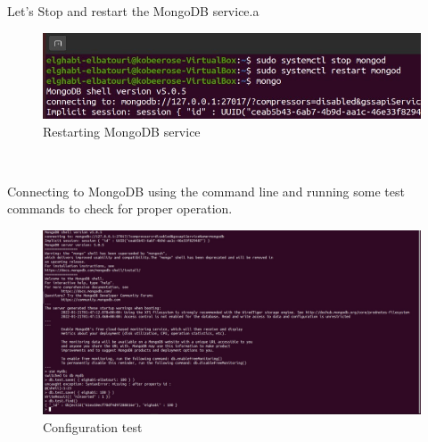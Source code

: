 \begin{spacing}{1.2}
\par Let's Stop and restart the MongoDB service.a
\\
\begin{figure}[!htb] 
\begin{center} 
\includegraphics[width=1\linewidth]{Pictures/MongoDB/Installation and manipulation of MongoDB/Mongodb service management/restarting MongoDB service} 
\end{center} 
\caption{Restarting MongoDB service} 
\end{figure}  \FloatBarrier
\\
\newpage
\par Connecting to MongoDB using the command line and running some test commands to
check for proper operation.
\\
\begin{figure}[!htb] 
\begin{center} 
\includegraphics[width=1\linewidth]{Pictures/MongoDB/Installation and manipulation of MongoDB/Mongodb service management/configuration test} 
\end{center} 
\caption{Configuration test} 
\end{figure}  \FloatBarrier
\\

\end{spacing}